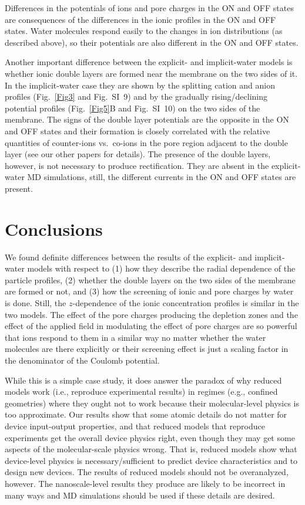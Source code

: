 \documentclass[fleqn,10pt]{SelfArx} %
\begin{document}
Differences in the potentials of ions and pore charges in the ON and OFF states are consequences of the differences in the ionic profiles in the ON and OFF states.
Water molecules respond easily to the changes in ion distributions (as described above), so their potentials are also different in the ON and OFF states.


Another important difference between the explicit- and implicit-water models is whether ionic double layers are formed near the membrane on the two sides of it.
In the implicit-water case they are shown by the splitting cation and anion profiles (Fig.\ \ref{Fig3} and Fig.\ SI\ 9) and by the gradually rising/declining potential profiles (Fig.\ \ref{Fig5}B and Fig.\ SI\ 10) on the two sides of the membrane. 
The signs of the double layer potentials are the opposite in the ON and OFF states and their formation is closely correlated with the relative quantities of counter-ions vs.\ co-ions in the pore region adjacent to the double layer (see our other papers \cite{hato-cmp-19-13802-2016,matejczyk-jcp-submitted-2017} for details). 
The presence of the double layers, however, is not necessary to produce rectification.
They are absent in the explicit-water MD simulations, still, the different currents in the ON and OFF states are present.

\section*{Conclusions}

We found definite differences between the results of the explicit- and implicit-water models with respect to (1) how they describe the radial dependence of the particle profiles, (2) whether the double layers on the two sides of the membrane are formed or not, and (3) how the screening of ionic and pore charges by water is done.
Still, the $z$-dependence of the ionic concentration profiles is similar in the two models.
The effect of the pore charges producing the depletion zones and the effect of the applied field in modulating the effect of pore charges are so powerful that ions respond to them in a similar way no matter whether the water molecules are there explicitly or their screening effect is just a scaling factor in the denominator of the Coulomb potential.

While this is a simple case study, it does answer the paradox of why reduced models work (i.e., reproduce experimental results) in regimes (e.g., confined geometries) where they ought not to work because their molecular-level physics is too approximate.
Our results show that some atomic details do not matter for device input-output properties, and that reduced models that reproduce experiments get the overall device physics right, even though they may get some aspects of the molecular-scale physics wrong.
That is, reduced models show what device-level physics is necessary/sufficient to predict device characteristics and to design new devices.
The results of reduced models should not be overanalyzed, however.
The nanoscale-level results they produce are likely to be incorrect in many ways and MD simulations should be used if these details are desired.
\end{document}
